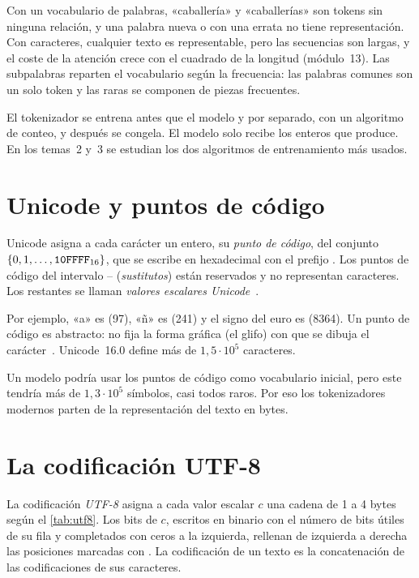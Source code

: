 Con un vocabulario de palabras, «caballería» y «caballerías» son tokens sin ninguna relación, y una palabra nueva o con una errata no tiene representación. Con caracteres, cualquier texto es representable, pero las secuencias son largas, y el coste de la atención crece con el cuadrado de la longitud (módulo~13). Las subpalabras reparten el vocabulario según la frecuencia: las palabras comunes son un solo token y las raras se componen de piezas frecuentes.

\begin{observacion}\label{obs:congelado}
El tokenizador se entrena antes que el modelo y por separado, con un algoritmo de conteo, y después se congela. El modelo solo recibe los enteros que produce. En los temas~2 y~3 se estudian los dos algoritmos de entrenamiento más usados.
\end{observacion}

\section{Unicode y puntos de código}

\begin{definicion}
Unicode asigna a cada carácter un entero, su \emph{punto de código}, del conjunto $\{0,1,\dots,\texttt{10FFFF}_{16}\}$, que se escribe en hexadecimal con el prefijo . Los puntos de código del intervalo -- (\emph{sustitutos}) están reservados y no representan caracteres. Los restantes se llaman \emph{valores escalares Unicode}~\cite{rfc3629}.
\end{definicion}

Por ejemplo, «a» es  (97), «ñ» es  (241) y el signo del euro es  (8364). Un punto de código es abstracto: no fija la forma gráfica (el glifo) con que se dibuja el carácter~\cite[§2.3.1]{jm3}. Unicode~16.0 define más de $1{,}5\cdot 10^{5}$ caracteres.

Un modelo podría usar los puntos de código como vocabulario inicial, pero este tendría más de $1{,}3\cdot 10^{5}$ símbolos, casi todos raros. Por eso los tokenizadores modernos parten de la representación del texto en bytes.

\section{La codificación UTF-8}

\begin{definicion}[UTF-8]\label{def:utf8}
La codificación \emph{UTF-8} asigna a cada valor escalar $c$ una cadena de 1 a 4 bytes según el \cref{tab:utf8}. Los bits de $c$, escritos en binario con el número de bits útiles de su fila y completados con ceros a la izquierda, rellenan de izquierda a derecha las posiciones marcadas con . La codificación de un texto es la concatenación de las codificaciones de sus caracteres.
\end{definicion}

